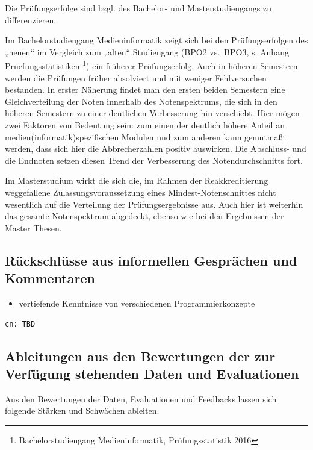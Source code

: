 Die Prüfungserfolge sind bzgl. des Bachelor- und Masterstudiengangs zu
differenzieren.

Im Bachelorstudiengang Medieninformatik zeigt sich bei den
Prüfungserfolgen des „neuen`` im Vergleich zum „alten`` Studiengang
(BPO2 vs.~BPO3, s. Anhang Pruefungsstatistiken \footnote{Bachelorstudiengang
  Medieninformatik, Prüfungsstatistik 2016}) ein früherer
Prüfungserfolg. Auch in höheren Semestern werden die Prüfungen früher
absolviert und mit weniger Fehlversuchen bestanden. In erster Näherung
findet man den ersten beiden Semestern eine Gleichverteilung der Noten
innerhalb des Notenspektrums, die sich in den höheren Semestern zu einer
deutlichen Verbesserung hin verschiebt. Hier mögen zwei Faktoren von
Bedeutung sein: zum einen der deutlich höhere Anteil an
medien(informatik)spezifischen Modulen und zum anderen kann gemutmaßt
werden, dass sich hier die Abbrecherzahlen positiv auswirken. Die
Abschluss- und die Endnoten setzen diesen Trend der Verbesserung des
Notendurchschnitts fort.

Im Masterstudium wirkt die sich die, im Rahmen der Reakkreditierung
weggefallene Zulassungsvoraussetzung eines Mindest-Notenschnittes nicht
wesentlich auf die Verteilung der Prüfungsergebnisse aus. Auch hier ist
weiterhin das gesamte Notenspektrum abgedeckt, ebenso wie bei den
Ergebnissen der Master Thesen.

\subsection{Rückschlüsse aus informellen Gesprächen und
Kommentaren}\label{ruxfcckschluxfcsse-aus-informellen-gespruxe4chen-und-kommentaren}

\begin{itemize}
\tightlist
\item
  vertiefende Kenntnisse von verschiedenen Programmierkonzepte
\end{itemize}

\begin{verbatim}
cn: TBD
\end{verbatim}

\subsection{Ableitungen aus den Bewertungen der zur Verfügung
stehenden Daten und
Evaluationen}\label{ableitungen-aus-den-bewertungen-der-zur-verfuxfcgung-stehenden-daten-und-evaluationen}

Aus den Bewertungen der Daten, Evaluationen und Feedbacks lassen sich
folgende Stärken und Schwächen ableiten.

